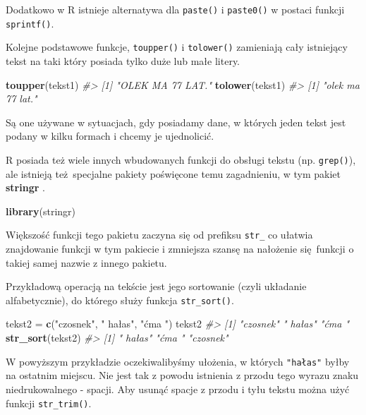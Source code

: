 \documentclass[paper=6in:9in,pagesize=pdftex,headinclude=on,footinclude=on,10pt]{scrbook}
\newenvironment{Shaded}{\begin{snugshade}}{\end{snugshade}}
\newcommand{\CommentTok}[1]{\textcolor[rgb]{0.56,0.35,0.01}{\textit{#1}}}
\newcommand{\KeywordTok}[1]{\textcolor[rgb]{0.13,0.29,0.53}{\textbf{#1}}}
\newcommand{\NormalTok}[1]{#1}
\newcommand{\StringTok}[1]{\textcolor[rgb]{0.31,0.60,0.02}{#1}}
\begin{document}
Dodatkowo w R istnieje alternatywa dla \texttt{paste()} i \texttt{paste0()} w postaci funkcji \texttt{sprintf()}.

Kolejne podstawowe funkcje, \texttt{toupper()} i \texttt{tolower()} zamieniają cały istniejący tekst na taki który posiada tylko duże lub małe litery.

\begin{Shaded}
\begin{Highlighting}[]
\KeywordTok{toupper}\NormalTok{(tekst1)}
\CommentTok{#> [1] "OLEK MA 77 LAT."}
\KeywordTok{tolower}\NormalTok{(tekst1)}
\CommentTok{#> [1] "olek ma 77 lat."}
\end{Highlighting}
\end{Shaded}

Są one używane w sytuacjach, gdy posiadamy dane, w których jeden tekst jest podany w kilku formach i chcemy je ujednolicić.

R posiada też wiele innych wbudowanych funkcji do obsługi tekstu (np. \texttt{grep()}), ale istnieją też~specjalne pakiety poświęcone temu zagadnieniu, w tym pakiet \textbf{stringr} \citep{R-stringr}.

\begin{Shaded}
\begin{Highlighting}[]
\KeywordTok{library}\NormalTok{(stringr)}
\end{Highlighting}
\end{Shaded}

Większość funkcji tego pakietu zaczyna się od prefiksu \texttt{str\_} co ułatwia znajdowanie funkcji w tym pakiecie i zmniejsza szansę na nałożenie się~funkcji o takiej samej nazwie z innego pakietu.

Przykładową operacją na tekście jest jego sortowanie (czyli układanie alfabetycznie), do którego służy funkcja \texttt{str\_sort()}.

\begin{Shaded}
\begin{Highlighting}[]
\NormalTok{tekst2 =}\StringTok{ }\KeywordTok{c}\NormalTok{(}\StringTok{"czosnek"}\NormalTok{, }\StringTok{" hałas"}\NormalTok{, }\StringTok{"ćma "}\NormalTok{)}
\NormalTok{tekst2}
\CommentTok{#> [1] "czosnek" " hałas"  "ćma "}
\KeywordTok{str_sort}\NormalTok{(tekst2)}
\CommentTok{#> [1] " hałas"  "ćma "    "czosnek"}
\end{Highlighting}
\end{Shaded}

W powyższym przykładzie oczekiwalibyśmy ułożenia, w których \texttt{"hałas"} byłby na ostatnim miejscu.
Nie jest tak z powodu istnienia z przodu tego wyrazu znaku niedrukowalnego - spacji.
Aby usunąć spacje z przodu i tyłu tekstu można użyć funkcji \texttt{str\_trim()}.
\end{document}
